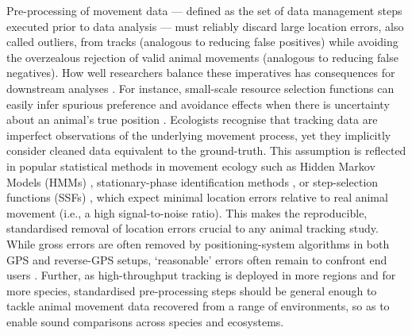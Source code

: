 \begin{refsection}
    Pre-processing of movement data --- defined as the set of data management steps executed prior to data analysis --- must reliably discard large location errors, also called outliers, from tracks (analogous to reducing false positives) while avoiding the overzealous rejection of valid animal movements (analogous to reducing false negatives).
    How well researchers balance these imperatives has consequences for downstream analyses \cite{stine2001}.
    For instance, small-scale resource selection functions can easily infer spurious preference and avoidance effects when there is uncertainty about an animal's true position \cite{visscher2006}.
    Ecologists recognise that tracking data are imperfect observations of the underlying movement process, yet they implicitly consider cleaned data equivalent to the ground-truth.
    This assumption is reflected in popular statistical methods in movement ecology such as Hidden Markov Models (HMMs) \cite{langrock2012}, stationary-phase identification methods \cite{patin2020a}, or step-selection functions (SSFs) \cite{barnett2008, signer2017, avgar2016}, which expect minimal location errors relative to real animal movement (i.e., a high signal-to-noise ratio).
    This makes the reproducible, standardised removal of location errors crucial to any animal tracking study.
    While gross errors are often removed by positioning-system algorithms in both GPS and reverse-GPS setups, `reasonable’ errors often remain to confront end users \cite{fischler1981, weiser2016, ranacher2016}.
    Further, as high-throughput tracking is deployed in more regions and for more species, standardised pre-processing steps should be general enough to tackle animal movement data recovered from a range of environments, so as to enable sound comparisons across species and ecosystems.


\end{refsection}
